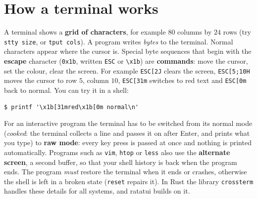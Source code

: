 \section*{How a terminal works}
A terminal shows a \textbf{grid of characters}, for example $80$ columns by $24$ rows (try \verb!stty size!, or \verb!tput cols!). A program writes \emph{bytes} to the terminal. Normal characters appear where the cursor is. Special byte sequences that begin with the \textbf{escape} character (\verb!0x1b!, written \verb!ESC! or \verb!\x1b!) are \textbf{commands}: move the cursor, set the colour, clear the screen. For example \verb!ESC[2J! clears the screen, \verb!ESC[5;10H! moves the cursor to row $5$, column $10$, \verb!ESC[31m! switches to red text and \verb!ESC[0m! back to normal. You can try it in a shell:
\begin{verbatim}
$ printf '\x1b[31mred\x1b[0m normal\n'
\end{verbatim}
For an interactive program the terminal has to be switched from its normal mode (\emph{cooked}: the terminal collects a line and passes it on after Enter, and prints what you type) to \textbf{raw mode}: every key press is passed at once and nothing is printed automatically. Programs such as \verb!vim!, \verb!htop! or \verb!less! also use the \textbf{alternate screen}, a second buffer, so that your shell history is back when the program ends. The program \emph{must} restore the terminal when it ends or crashes, otherwise the shell is left in a broken state (\verb!reset! repairs it). In Rust the library \verb!crossterm! handles these details for all systems, and ratatui builds on it.

